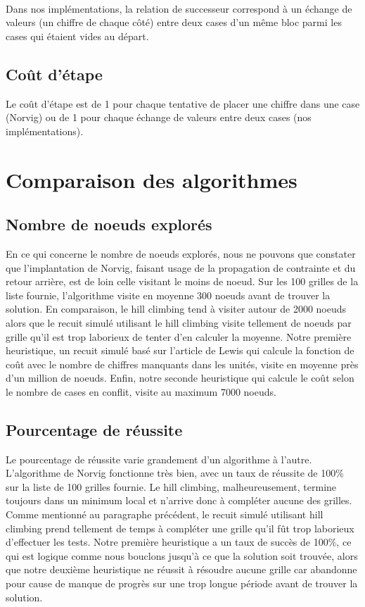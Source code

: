 \documentclass[12pt]{article}
\begin{document}
\paragraph{}
Dans nos implémentations, la relation de successeur correspond à un échange de valeurs (un chiffre de chaque côté) entre deux cases d'un même bloc parmi les cases qui étaient vides au départ.

\subsection{Coût d'étape}
Le coût d'étape est de 1 pour chaque tentative de placer une chiffre dans une case (Norvig) ou de 1 pour chaque échange de valeurs entre deux cases (nos implémentations).


\section{Comparaison des algorithmes}

\subsection{Nombre de noeuds explorés}
En ce qui concerne le nombre de noeuds explorés, nous ne pouvons que constater que l'implantation de Norvig, faisant usage de la propagation de contrainte et du retour arrière, est de loin celle visitant le moins de noeud. Sur les 100 grilles de la liste fournie, l'algorithme visite en moyenne 300 noeuds avant de trouver la solution. En comparaison, le hill climbing tend à visiter autour de 2000 noeuds alors que le recuit simulé utilisant le hill climbing visite tellement de noeuds par grille qu'il est trop laborieux de tenter d'en calculer la moyenne. Notre première heuristique, un recuit simulé basé sur l'article de Lewis qui calcule la fonction de coût avec le nombre de chiffres manquants dans les unités, visite en moyenne près d'un million de noeuds. Enfin, notre seconde heuristique qui calcule le coût selon le nombre de cases en conflit, visite au maximum 7000 noeuds.

\subsection{Pourcentage de réussite}
Le pourcentage de réussite varie grandement d'un algorithme à l'autre. L'algorithme de Norvig fonctionne très bien, avec un taux de réussite de 100\% sur la liste de 100 grilles fournie. Le hill climbing, malheureusement, termine toujours dans un minimum local et n'arrive donc à compléter aucune des grilles. Comme mentionné au paragraphe précédent, le recuit simulé utilisant hill climbing prend tellement de temps à compléter une grille qu'il fût trop laborieux d'effectuer les tests. Notre première heuristique a un taux de succès de 100\%, ce qui est logique comme nous bouclons jusqu'à ce que la solution soit trouvée, alors que notre deuxième heuristique ne réussit à résoudre aucune grille car abandonne pour cause de manque de progrès sur une trop longue période avant de trouver la solution.
\end{document}
